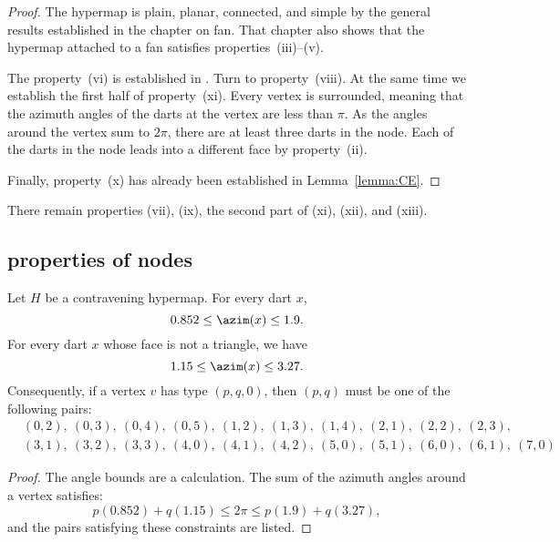\begin{proof}
The hypermap is plain, planar, connected, and simple by the general results established in the chapter on fan.  That chapter also shows that the hypermap attached to a fan satisfies properties~(iii)--(v).  

The property~(vi) is established in \cite[Lemma~3.7]{sp1}.
Turn to property~(viii). At the same time we establish the first half of property~(xi).  Every vertex is surrounded, meaning that the azimuth angles of the darts at the vertex are less than $\pi$.  As the angles around the vertex sum to $2\pi$, there are at least three darts in the node. Each of the darts in the node leads into a different face by property~(ii).

Finally, property~(x) has already been established in Lemma~\ref{lemma:CE}.
\end{proof}

There remain properties (vii), (ix), the second part of (xi), (xii), and (xiii).







\subsection{properties of nodes}




\begin{lemma} \label{lemma:0.852}
Let $H$ be a contravening
hypermap. For every dart $x$,
    $$0.852\le \azim(x)\le 1.9.$$
For every dart $x$ whose face is not a triangle, we have
    $$1.15\le\azim(x)\le 3.27.$$
Consequently, if a vertex $v$ has type $(p,q,0)$, then $(p,q)$
must be one of the following pairs:
$$
\begin{array}{lll}
&(0,2),~(0,3),~(0,4),~(0,5),~(1,2),~(1,3),~(1,4),~(2,1),~(2,2),~(2,3),\\
&(3,1),~(3,2),~(3,3),~(4,0),~(4,1),~(4,2),~(5,0),~(5,1),~(6,0),~(6,1),~(7,0)
\end{array}
$$
\end{lemma}
\begin{proof}
The angle bounds are a calculation.  The sum of the azimuth angles
around a vertex satisfies:
$$
  p (0.852) + q (1.15) \le 2\pi \le p (1.9) + q (3.27),
$$
and the pairs satisfying these constraints are listed.
\end{proof}

